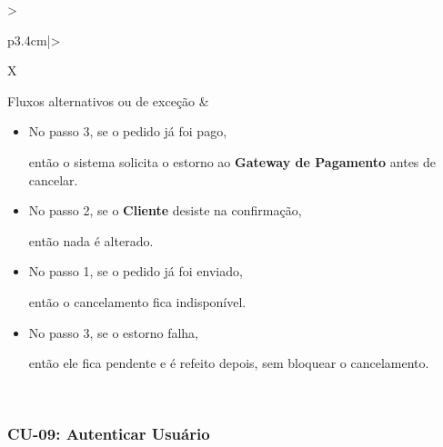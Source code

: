 \documentclass[12pt,a4paper]{article}
\begin{document}
{\begin{xltabular}{\textwidth}{>{\raggedright\arraybackslash}p{3.4cm}|>{\raggedright\arraybackslash}X}
Fluxos alternativos ou de exceção & \begin{itemize}[nosep,leftmargin=2.2em,labelwidth=2.2em,labelsep=0pt,align=left,itemsep=4pt,before=\vspace{-\baselineskip},after=\vspace{-0.4\baselineskip}]\item[\textbf{A1}] No passo 3, se o pedido já foi pago,\par então o sistema solicita o estorno ao \textbf{Gateway de Pagamento} antes de cancelar. \item[\textbf{A2}] No passo 2, se o \textbf{Cliente} desiste na confirmação,\par então nada é alterado. \item[\textbf{E1}] No passo 1, se o pedido já foi enviado,\par então o cancelamento fica indisponível. \item[\textbf{E2}] No passo 3, se o estorno falha,\par então ele fica pendente e é refeito depois, sem bloquear o cancelamento.\end{itemize}\\ \bottomrule
\end{xltabular}}

\Needspace{200pt}
\subsubsection{CU-09: Autenticar Usuário}
\end{document}
